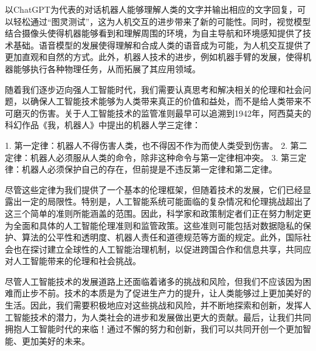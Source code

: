 以ChatGPT为代表的对话机器人能够理解人类的文字并输出相应的文字回复，可以轻松通过“图灵测试”，这为人机交互的进步带来了新的可能性。同时，视觉模型结合摄像头使得机器能够看到和理解周围的环境，为自主导航和环境感知提供了技术基础。语音模型的发展使得理解和合成人类的语音成为可能，为人机交互提供了更加直观和自然的方式。此外，机器人技术的进步，例如机器手臂的发展，使得机器能够执行各种物理任务，从而拓展了其应用领域。

随着我们逐步迈向强人工智能时代，我们需要认真思考和解决相关的伦理和社会问题，以确保人工智能技术能够为人类带来真正的价值和益处，而不是给人类带来不可磨灭的伤害。关于人工智能技术的监管准则最早可以追溯到1942年，阿西莫夫的科幻作品《我，机器人》中提出的机器人学三定律：

1. 第一定律：机器人不得伤害人类，也不得因不作为而使人类受到伤害。
2. 第二定律：机器人必须服从人类的命令，除非这种命令与第一定律相冲突。
3. 第三定律：机器人必须保护自己的存在，但前提是不违反第一定律和第二定律。

尽管这些定律为我们提供了一个基本的伦理框架，但随着技术的发展，它们已经显露出一定的局限性。特别是，人工智能系统可能面临的复杂情况和伦理挑战超出了这三个简单的准则所能涵盖的范围。因此，科学家和政策制定者们正在努力制定更为全面和具体的人工智能伦理准则和监管政策。这些准则可能包括对数据隐私的保护、算法的公平性和透明度、机器人责任和道德规范等方面的规定。此外，国际社会也在探讨建立全球性的人工智能治理机制，以促进跨国合作和信息共享，共同应对人工智能带来的伦理和社会挑战。

尽管人工智能技术的发展道路上还面临着诸多的挑战和风险，但我们不应该因为困难而止步不前。技术的本质是为了促进生产力的提升，让人类能够过上更加美好的生活。因此，我们需要积极地应对这些挑战和风险，并不断地探索和创新，发挥人工智能技术的潜力，为人类社会的进步和发展做出更大的贡献。最后，让我们共同拥抱人工智能时代的来临！通过不懈的努力和创新，我们可以共同开创一个更加智能、更加美好的未来。